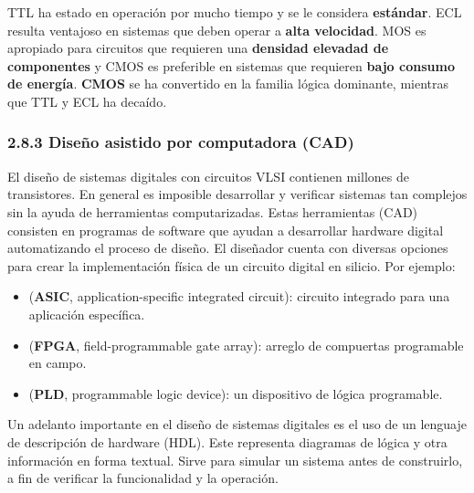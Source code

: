 TTL ha estado en operaci\'{o}n por mucho tiempo y se le considera
\textbf{est\'{a}ndar}. ECL resulta ventajoso en sistemas que deben operar a
\textbf{alta velocidad}. MOS es apropiado para circuitos que requieren una
\textbf{densidad elevadad de componentes} y CMOS es preferible en sistemas que
requieren \textbf{bajo consumo de energ\'{i}a}. \textbf{CMOS} se ha convertido
en la familia l\'{o}gica dominante, mientras que TTL y ECL ha deca\'{i}do.

\subsubsection*{2.8.3 Dise\~{n}o asistido por computadora (CAD)}
El dise\~{n}o de sistemas digitales con circuitos VLSI contienen millones de transistores.
En general es imposible desarrollar y verificar sistemas tan complejos sin la ayuda de
herramientas computarizadas. Estas herramientas (CAD) consisten en programas de software que
ayudan a desarrollar hardware digital automatizando el proceso de dise\~{n}o. El dise\~{n}ador
cuenta con diversas opciones para crear la implementaci\'{o}n f\'{i}sica de un circuito digital en silicio. Por ejemplo:

\begin{itemize}
    \item
          (\textbf{ASIC}, application-specific integrated circuit):
          circuito integrado para una aplicaci\'{o}n espec\'{i}fica.
    \item
          (\textbf{FPGA}, field-programmable gate array):
          arreglo de compuertas programable en campo.
    \item
          (\textbf{PLD}, programmable logic device):
          un dispositivo de l\'{o}gica programable.
\end{itemize}

Un adelanto importante en el dise\~{n}o de sistemas digitales es el uso de un lenguaje de 
descripci\'{o}n de hardware (HDL). Este representa diagramas de l\'{o}gica y otra informaci\'{o}n 
en forma textual. Sirve para simular un sistema antes de construirlo, a fin de verificar la 
funcionalidad y la operaci\'{o}n.